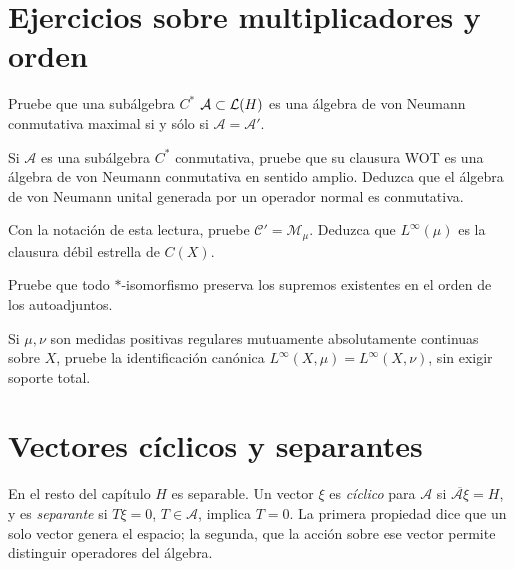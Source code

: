 \section{Ejercicios sobre multiplicadores y orden}

\begin{ejercicio}\label{ej:v3-l35-1}
Pruebe que una subálgebra $C^*$ $\mathcal A\subset\mathcal L(H)$ es una álgebra de von Neumann conmutativa maximal si y sólo si $\mathcal A=\mathcal A'$.
\end{ejercicio}


\begin{ejercicio}\label{ej:v3-l35-2}
Si $\mathcal A$ es una subálgebra $C^*$ conmutativa, pruebe que su clausura WOT es una álgebra de von Neumann conmutativa en sentido amplio. Deduzca que el álgebra de von Neumann unital generada por un operador normal es conmutativa.
\end{ejercicio}


\begin{ejercicio}\label{ej:v3-l35-3}
Con la notación de esta lectura, pruebe $\mathcal C'=\mathcal M_\mu$. Deduzca que $L^\infty(\mu)$ es la clausura débil estrella de $C(X)$.
\end{ejercicio}


\begin{ejercicio}\label{ej:v3-l35-4}
Pruebe que todo $*$-isomorfismo preserva los supremos existentes en el orden de los autoadjuntos.
\end{ejercicio}


\begin{ejercicio}\label{ej:v3-l35-5}
Si $\mu,\nu$ son medidas positivas regulares mutuamente absolutamente continuas sobre $X$, pruebe la identificación canónica $L^\infty(X,\mu)=L^\infty(X,\nu)$, sin exigir soporte total.
\end{ejercicio}


\section{Vectores cíclicos y separantes}\label{lec:v3-36}

En el resto del capítulo $H$ es separable. Un vector $\xi$ es \emph{cíclico} para $\mathcal A$ si $\overline{\mathcal A\xi}=H$, y es \emph{separante} si $T\xi=0$, $T\in\mathcal A$, implica $T=0$. La primera propiedad dice que un solo vector genera el espacio; la segunda, que la acción sobre ese vector permite distinguir operadores del álgebra.

